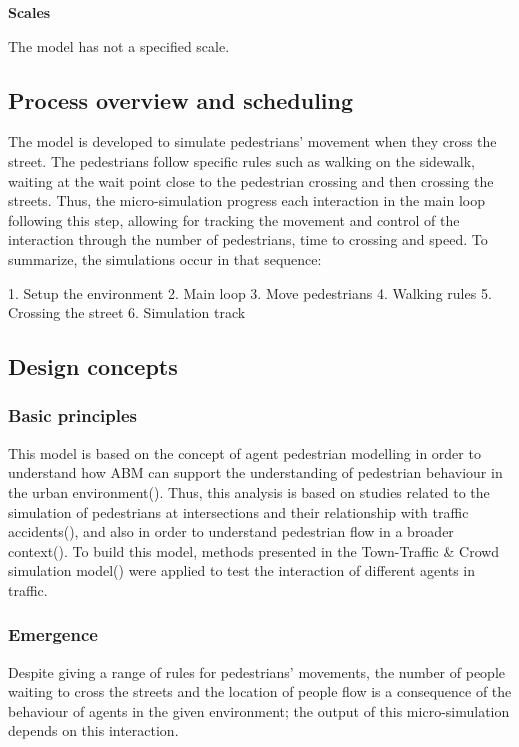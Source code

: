 \documentclass[10pt]{report}
\numberwithin{figure}{section}
\numberwithin{table}{section}
\begin{document}
\newpage

\textbf{Scales}

The model has not a specified scale. 

\subsection{Process overview and scheduling}


The model is developed to simulate pedestrians' movement when they cross the street. The pedestrians follow specific rules such as walking on the sidewalk, waiting at the wait point close to the pedestrian crossing and then crossing the streets. Thus, the micro-simulation progress each interaction in the main loop following this step, allowing for tracking the movement and control of the interaction through the number of pedestrians, time to crossing and speed. To summarize, the simulations occur in that sequence:

1. Setup the environment
2. Main loop
3. Move pedestrians
4. Walking rules
5. Crossing the street
6. Simulation track


\subsection{Design concepts}

\subsubsection{Basic principles}

This model is based on the concept of agent pedestrian modelling in order to understand how ABM can support the understanding of pedestrian behaviour in the urban environment(\cite{batty_agent-based_2001}). Thus, this analysis is based on studies related to the simulation of pedestrians at intersections and their relationship with traffic accidents(\cite{cohen_microscopic_2018}), and also in order to understand pedestrian flow in a broader context(\cite{chen_delineating_2021}). To build this model, methods presented in the Town-Traffic \& Crowd simulation model(\cite{lukas_netlogo_nodate}) were applied to test the interaction of different agents in traffic.

\subsubsection{Emergence}
 Despite giving a range of rules for pedestrians' movements, the number of people waiting to cross the streets and the location of people flow is a consequence of the behaviour of agents in the given environment; the output of this micro-simulation depends on this interaction. 
\end{document}
